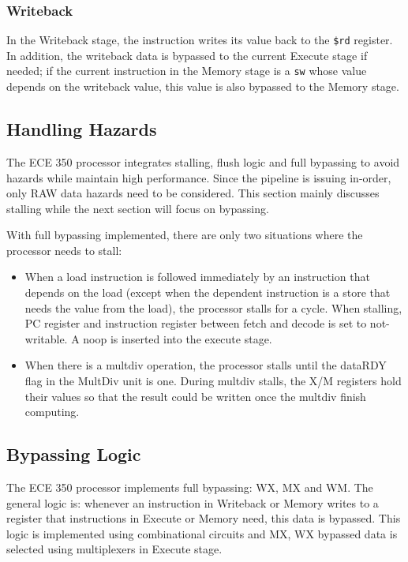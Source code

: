 \documentclass{article}
\begin{document}
\subsubsection{Writeback}
In the Writeback stage, the instruction writes its value back to the \texttt{\$rd} register. In addition, the writeback data is bypassed to the current Execute stage if needed; if the current instruction in the Memory stage is a \texttt{sw} whose value depends on the writeback value, this value is also bypassed to the Memory stage.

\subsection{Handling Hazards}
The ECE 350 processor integrates stalling, flush logic and full bypassing to avoid hazards while maintain high performance. Since the pipeline is issuing in-order, only RAW data hazards need to be considered. This section mainly discusses stalling while the next section will focus on bypassing. \par
With full bypassing implemented, there are only two situations where the processor needs to stall:
\begin{itemize}
    \item When a load instruction is followed immediately by an instruction that depends on the load (except when the dependent instruction is a store that needs the value from the load), the processor stalls for a cycle. When stalling, PC register and instruction register between fetch and decode is set to not-writable. A noop is inserted into the execute stage.
    \item When there is a multdiv operation, the processor stalls until the dataRDY flag in the MultDiv unit is one. During multdiv stalls, the X/M registers hold their values so that the result could be written once the multdiv finish computing.
\end{itemize}

\subsection{Bypassing Logic}
The ECE 350 processor implements full bypassing: WX, MX and WM. The general logic is: whenever an instruction in Writeback or Memory writes to a register that instructions in Execute or Memory need, this data is bypassed. This logic is implemented using combinational circuits and MX, WX bypassed data is selected using multiplexers in Execute stage.
\end{document}
